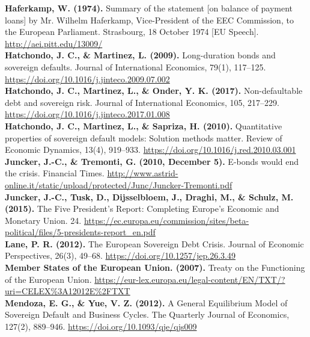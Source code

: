\textbf{Haferkamp, W. (1974).} Summary of the statement [on balance of payment loans] by Mr. Wilhelm Haferkamp, Vice-President of the EEC Commission, to the European Parliament. Strasbourg, 18 October 1974 [EU Speech]. \url{http://aei.pitt.edu/13009/}\\

\textbf{Hatchondo, J. C., \& Martinez, L. (2009).} Long-duration bonds and sovereign defaults. Journal of International Economics, 79(1), 117–125. \url{https://doi.org/10.1016/j.jinteco.2009.07.002}\\

\textbf{Hatchondo, J. C., Martinez, L., \& Onder, Y. K. (2017).} Non-defaultable debt and sovereign risk. Journal of International Economics, 105, 217–229. \url{https://doi.org/10.1016/j.jinteco.2017.01.008}\\

\textbf{Hatchondo, J. C., Martinez, L., \& Sapriza, H. (2010).} Quantitative properties of sovereign default models: Solution methods matter. Review of Economic Dynamics, 13(4), 919–933. \url{https://doi.org/10.1016/j.red.2010.03.001}\\

\textbf{Juncker, J.-C., \& Tremonti, G. (2010, December 5).} E-bonds would end the crisis. Financial Times. \url{http://www.astrid-online.it/static/upload/protected/Junc/Juncker-Tremonti.pdf}\\

\textbf{Juncker, J.-C., Tusk, D., Dijsselbloem, J., Draghi, M., \& Schulz, M. (2015).} The Five President’s Report: Completing Europe’s Economic and Monetary Union. 24. \url{https://ec.europa.eu/commission/sites/beta-political/files/5-presidents-}\linebreak\url{report_en.pdf}\\

\textbf{Lane, P. R. (2012).} The European Sovereign Debt Crisis. Journal of Economic Perspectives, 26(3), 49–68. \url{https://doi.org/10.1257/jep.26.3.49}\\

\textbf{Member States of the European Union. (2007).} Treaty on the Functioning of the European Union. \url{https://eur-lex.europa.eu/legal-content/EN/TXT/?uri=CELEX%3A12012E%2FTXT}\\

\textbf{Mendoza, E. G., \& Yue, V. Z. (2012).} A General Equilibrium Model of Sovereign Default and Business Cycles. The Quarterly Journal of Economics, 127(2), 889–946. \url{https://doi.org/10.1093/qje/qjs009}\\

